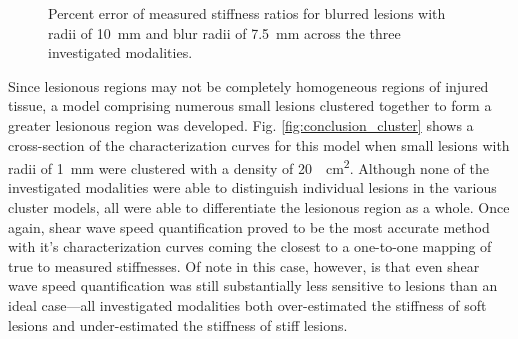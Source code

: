 			\begin{figure}[!htb]
				\centering
				\caption[Percent error of measured stiffness ratios for blurred lesions across the three investigated modalities]{Percent error of measured stiffness ratios for blurred lesions with radii of \SI{10}{\mm} and blur radii of \SI{7.5}{\mm} across the three investigated modalities.}
				\label{fig:conclusions_blur_pd}
			\end{figure}

			Since lesionous regions may not be completely homogeneous regions of injured tissue, a model comprising numerous small lesions clustered together to form a greater lesionous region was developed. Fig. \ref{fig:conclusion_cluster} shows a cross-section of the characterization curves for this model when small lesions with radii of \SI{1}{\mm} were clustered with a density of \SI{20}{\per\cm\squared}. Although none of the investigated modalities were able to distinguish individual lesions in the various cluster models, all were able to differentiate the lesionous region as a whole. Once again, shear wave speed quantification proved to be the most accurate method with it's characterization curves coming the closest to a one-to-one mapping of true to measured stiffnesses. Of note in this case, however, is that even shear wave speed quantification was still substantially less sensitive to lesions than an ideal case---all investigated modalities both over-estimated the stiffness of soft lesions and under-estimated the stiffness of stiff lesions.

